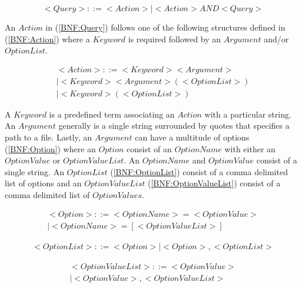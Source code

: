 \begin{equation} \label{BNF:Query}
<Query> ::= <Action> | <Action> AND <Query>
\end{equation}

An \(Action\) in (\ref{BNF:Query}) follows one of the following structures defined in (\ref{BNF:Action}) where a \(Keyword\) is required followed by an \(Argument\) and/or \(OptionList\).

\begin{equation} \label{BNF:Action}
\begin{split}
<Action> ::= <Keyword> <Argument> \\
| <Keyword> <Argument> (<Option List>) \\
| <Keyword> (<Option List>)
\end{split}
\end{equation}

A \(Keyword\) is a predefined term associating an \(Action\) with a particular string. An \(Argument\) generally is a single string surrounded by quotes that specifies a path to a file. Lastly,  an \(Argument\) can have a multitude of options (\ref{BNF:Option}) where an \(Option\) consist of an \(OptionName\) with either an \(OptionValue\) or \(OptionValueList\). An \(OptionName\) and \(OptionValue\) consist of a single string. An \(OptionList\) (\ref{BNF:OptionList}) consist of a comma delimited list of options and an \(OptionValueList\) (\ref{BNF:OptionValueList}) consist of a comma delimited list of \(OptionValues\).

\begin{equation} \label{BNF:Option}
\begin{split}
<Option> ::= <Option Name> = <Option Value> \\
		| <Option Name> = [<Option Value List>]
\end{split}
\end{equation}

\begin{equation} \label{BNF:OptionList}
\begin{split}
	<Option List> ::= <Option> | <Option>,  <Option List>
\end{split}
\end{equation}

\begin{equation} \label{BNF:OptionValueList}
\begin{split}
<Option Value List> ::= <Option Value> \\
| <Option Value> ,  <Option Value List>
\end{split}
\end{equation}

